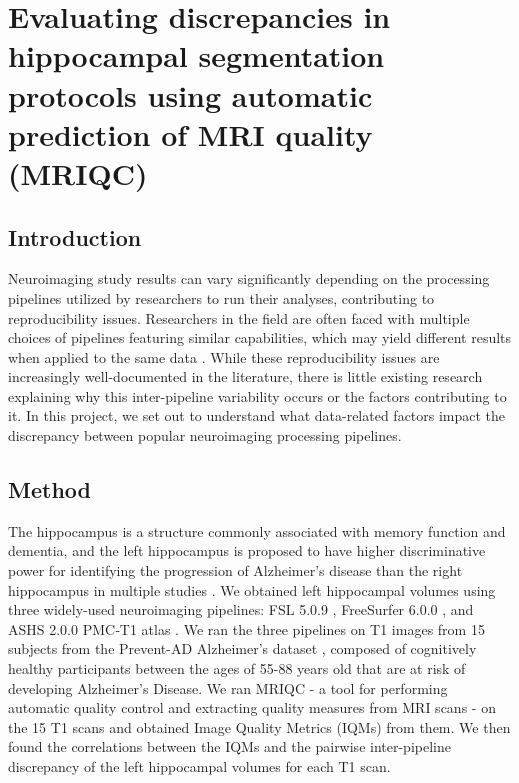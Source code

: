 \documentclass[../main.tex]{subfiles}
\begin{document}
\section{Evaluating discrepancies in hippocampal segmentation protocols using automatic prediction of MRI quality (MRIQC)}



\subsection{Introduction}

Neuroimaging study results can vary significantly depending on the processing pipelines utilized by researchers to run their analyses, contributing to reproducibility issues. Researchers in the field are often faced with multiple choices of pipelines featuring similar capabilities, which may yield different results when applied to the same data \parencite{carp2012plurality, kennedy2019everything}. While these reproducibility issues are increasingly well-documented in the literature, there is little existing research explaining why this inter-pipeline variability occurs or the factors contributing to it. In this project, we set out to understand what data-related factors impact the discrepancy between popular neuroimaging processing pipelines.

\subsection{Method}

The hippocampus is a structure commonly associated with memory function and dementia, and the left hippocampus is proposed to have higher discriminative power for identifying the progression of Alzheimer’s disease than the right hippocampus in multiple studies \parencite{schuff2009mri}. We obtained left hippocampal volumes using three widely-used neuroimaging pipelines: FSL 5.0.9 \parencite{patenaude2011bayesian}, FreeSurfer 6.0.0 \parencite{fischl2012freesurfer}, and ASHS 2.0.0 PMC‐T1 atlas \parencite{xie2019automated}.
We ran the three pipelines on T1 images from 15 subjects from the Prevent-AD Alzheimer’s dataset \parencite{tremblay2021open}, composed of cognitively healthy participants between the ages of 55-88 years old that are at risk of developing Alzheimer's Disease. 
We ran MRIQC \parencite{esteban2017mriqc} - a tool for performing automatic quality control and extracting quality measures from MRI scans - on the 15 T1 scans and obtained Image Quality Metrics (IQMs) from them. We then found the correlations between the IQMs and the pairwise inter-pipeline discrepancy of the left hippocampal volumes for each T1 scan.
\end{document}
